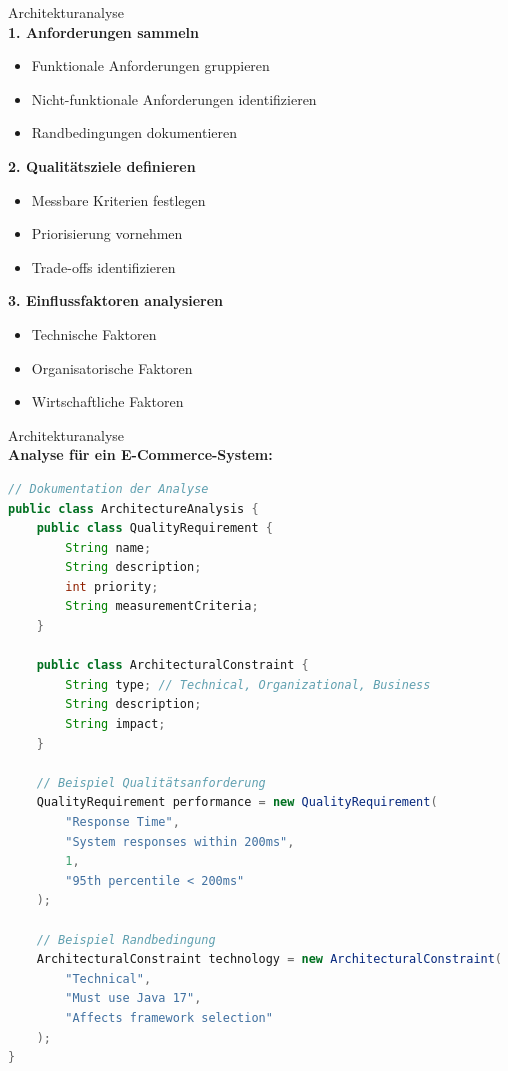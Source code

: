 \begin{KR}{Architekturanalyse}\\
\textbf{1. Anforderungen sammeln}
\begin{itemize}
    \item Funktionale Anforderungen gruppieren
    \item Nicht-funktionale Anforderungen identifizieren
    \item Randbedingungen dokumentieren
\end{itemize}

\textbf{2. Qualitätsziele definieren}
\begin{itemize}
    \item Messbare Kriterien festlegen
    \item Priorisierung vornehmen
    \item Trade-offs identifizieren
\end{itemize}

\textbf{3. Einflussfaktoren analysieren}
\begin{itemize}
    \item Technische Faktoren
    \item Organisatorische Faktoren
    \item Wirtschaftliche Faktoren
\end{itemize}
\end{KR}

\begin{example2}{Architekturanalyse}\\
\textbf{Analyse für ein E-Commerce-System:}

\begin{lstlisting}[language=Java, style=basesmol]
// Dokumentation der Analyse
public class ArchitectureAnalysis {
    public class QualityRequirement {
        String name;
        String description;
        int priority;
        String measurementCriteria;
    }
    
    public class ArchitecturalConstraint {
        String type; // Technical, Organizational, Business
        String description;
        String impact;
    }
    
    // Beispiel Qualitätsanforderung
    QualityRequirement performance = new QualityRequirement(
        "Response Time",
        "System responses within 200ms",
        1,
        "95th percentile < 200ms"
    );
    
    // Beispiel Randbedingung
    ArchitecturalConstraint technology = new ArchitecturalConstraint(
        "Technical",
        "Must use Java 17",
        "Affects framework selection"
    );
}
\end{lstlisting}
\end{example2}

